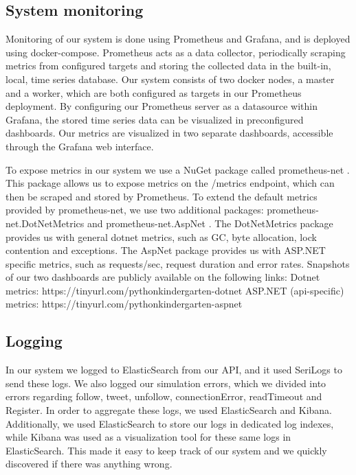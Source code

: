   
\subsection{System monitoring}
Monitoring of our system is done using Prometheus and Grafana, and is deployed using docker-compose. \newline
Prometheus acts as a data collector, periodically scraping metrics from configured targets and storing the collected data in the built-in, local, time series database.\newline
Our system consists of two docker nodes, a master and a worker, which are both configured as targets in our Prometheus deployment.\newline
By configuring our Prometheus server as a datasource within Grafana, the stored time series data can be visualized in preconfigured dashboards. Our metrics are visualized in two separate dashboards, accessible through the Grafana web interface.

To expose metrics in our system we use a NuGet package called prometheus-net \cite{prometheusnet}.
This package allows us to expose metrics on the /metrics endpoint, which can then be scraped and stored by Prometheus.
\newline
To extend the default metrics provided by prometheus-net, we use two additional packages: 
prometheus-net.DotNetMetrics \cite{prometheusdotnetmetrics} and prometheus-net.AspNet \cite{prometheusaspnet}.
\newline
The DotNetMetrics package provides us with general dotnet metrics, such as GC, byte allocation, lock contention and exceptions.
\newline
The AspNet package provides us with ASP.NET specific metrics, such as requests/sec, request duration and error rates.
\newline
\newline
Snapshots of our two dashboards are publicly available on the following links:
\newline
Dotnet metrics: https://tinyurl.com/pythonkindergarten-dotnet
\newline
ASP.NET (api-specific) metrics: https://tinyurl.com/pythonkindergarten-aspnet

\subsection{Logging}
In our system we logged to ElasticSearch from our API, and it used SeriLogs to send these logs. 
We also logged our simulation errors, which we divided into errors regarding follow, tweet, unfollow, connectionError, readTimeout and Register.
In order to aggregate these logs, we used ElasticSearch and Kibana. Additionally, we used ElasticSearch to store our logs in dedicated log indexes, while Kibana was used as a visualization tool for these same logs in ElasticSearch. This made it easy to keep track of our system and we quickly discovered if there was anything wrong. \newline

